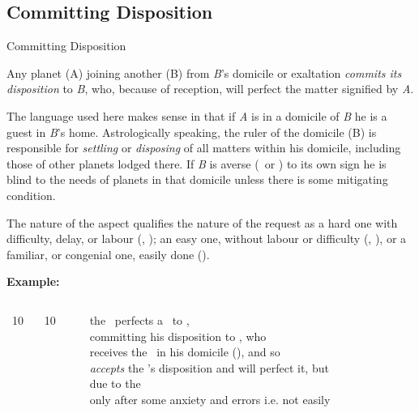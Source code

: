 \subsection{Committing Disposition}
\begin{frame}[t]{Committing Disposition}
\small
\begin{block}{}
Any planet (A) joining another (B) from \textsl{B}'s domicile or exaltation \textsl{commits its disposition} to \textsl{B}, who, because of reception, will perfect the matter signified by \textsl{A}.
\end{block}

The language used here makes sense in that if \textsl{A} is in a domicile of \textsl{B} he is a guest in \textsl{B}'s home. Astrologically speaking, the ruler of the domicile (B) is responsible for \textsl{settling} or \textsl{disposing} of all matters within his domicile, including those of other planets lodged there. If \textsl{B} is averse (\Semisextile\ or \Quincunx) to its own sign he is blind to the needs of planets in that domicile unless there is some mitigating condition.

The nature of the aspect qualifies the nature of the request as a hard one with difficulty, delay, or labour (\Square, \Opposition); an easy one, without labour or difficulty (\Sextile, \Trine), or a familiar, or congenial one, easily done (\Conjunction).

\textbf{Example:}
\begin{columns}[T, onlytextwidth]
\Sun\ 10 \Aries\ \Square\ \Mars\ 10 \Capricorn

\rule{.1mm}{.27\textheight}

the \Sun\ perfects a \Square\  to \Mars, \\
committing his disposition to \Mars, who  \\
receives the \Sun\ in his domicile (\Aries), and so \\
\textsl{accepts} the \Sun's disposition and will perfect it, but \\
due to the \Square\, \\ 
only after some anxiety and errors i.e. not easily
\end{columns}
\end{frame}
